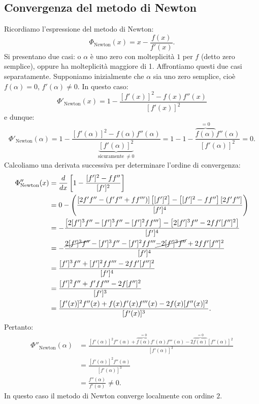\subsection{Convergenza del metodo di Newton}
Ricordiamo l'espressione del metodo di Newton:
\begin{equation*}
\Phi _{\text{Newton}}(x) =x-\frac{f(x)}{f'(x)}.
\end{equation*}
Si presentano due casi: o $\alpha $ è uno zero con molteplicità $1$ per $f$ (detto zero semplice), oppure ha molteplicità maggiore di 1.
Affrontiamo questi due casi separatamente.
Supponiamo inizialmente che $\alpha $ sia uno zero semplice, cioè $f( \alpha ) =0$, $f'( \alpha ) \neq 0$. In questo caso:
\begin{equation*}
\Phi '_{\text{Newton}}(x) =1-\frac{[ f'(x)]^{2} -f(x) f''(x)}{[ f'(x)]^{2}}
\end{equation*}
e dunque:
\begin{equation*}
\Phi '_{\text{Newton}}( \alpha ) =1-\frac{[ f'( \alpha )]^{2} -f( \alpha ) f''( \alpha )}{\underbrace{[ f'( \alpha )]^{2}}_{\text{sicuramente} \ \neq 0}} =1-1-\frac{\overbrace{f( \alpha )}^{=0} f''( \alpha )}{[ f'( \alpha )]^{2}} =0.
\end{equation*}
Calcoliamo una derivata successiva per determinare l'ordine di convergenza:
\begin{align*}
\Phi ''_{\text{Newton}}(x) & =\frac{d}{dx}\left[ 1-\frac{[ f']^{2} -ff''}{[ f']^{2}}\right]\\
 & =0-\left(\frac{[ 2f'f''-( f'f''+ff''')]\left[[ f']^{2}\right] -\left[[ f']^{2} -ff''\right][ 2f'f'']}{[ f']^{4}}\right)\\
 & =-\frac{\left[ 2[ f']^{3} f''-[ f']^{3} f''-[ f']^{2} ff'''\right] -\left[ 2[ f']^{3} f''-2ff'[ f'']^{2}\right]}{[ f']^{4}}\\
 & =-\frac{\cancel{2[ f']^{3} f''} -[ f']^{3} f''-[ f']^{2} ff'''\cancel{-2[ f']^{3} f''} +2ff'[ f'']^{2}}{[ f']^{4}}\\
 & =\frac{[ f']^{3} f''+[ f']^{2} ff'''-2ff'[ f'']^{2}}{[ f']^{4}}\\
 & =\frac{[ f']^{2} f''+f'ff'''-2f[ f'']^{2}}{[ f']^{3}}\\
 & =\frac{[ f'(x)]^{2} f''(x) +f(x) f'(x) f'''(x) -2f(x)[ f''(x)]^{2}}{[ f'(x)]^{3}}.
\end{align*}
Pertanto:
\begin{align*}
\Phi ''_{\text{Newton}}( \alpha ) & =\frac{[ f'( \alpha )]^{2} f''( \alpha ) +\overbrace{f( \alpha )}^{=0} f'( \alpha ) f'''( \alpha ) -2\overbrace{f( \alpha )}^{=0}[ f''( \alpha )]^{2}}{[ f'( \alpha )]^{3}}\\
 & =\frac{[ f'( \alpha )]^{2} f''( \alpha )}{[ f'( \alpha )]^{3}}\\
 & =\frac{f''( \alpha )}{f'( \alpha )} \neq 0.
\end{align*}
In questo caso il metodo di Newton converge localmente con ordine $2$.

